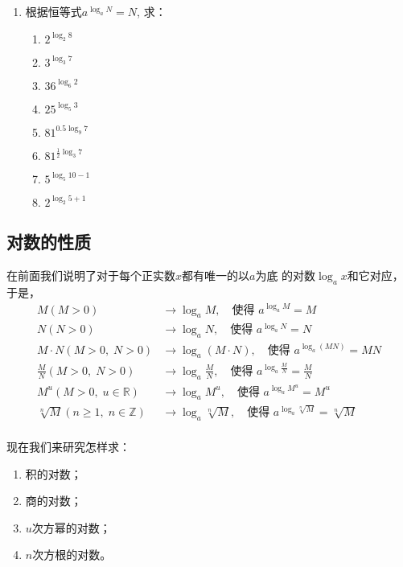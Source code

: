 \begin{ex}
\begin{enumerate}
\item 根据恒等式$a^{\log_a N}=N$, 求：
\begin{multicols}{3}
    \begin{enumerate}
        \item $2^{\log_2 8}$
        \item $3^{\log_3 7}$
        \item $36^{\log_6 2}$
        \item $25^{\log_5 3}$
        \item $81^{0.5\log_9 7}$
        \item $81^{\tfrac{1}{2}\log_3 7}$
        \item $5^{\log_5 10-1}$
        \item $2^{\log_2 5+1}$
    \end{enumerate}
    \end{multicols} 
\end{enumerate} 
\end{ex}

\subsection{对数的性质}
在前面我们说明了对于每个正实数$x$都有唯一的以$a$为底
的对数$\log_a x$和它对应，于是，
\[\begin{split}
   M(M>0)&\longrightarrow \log_a M,\quad \text{使得 } a^{\log_a M}=M \\
   N(N>0)&\longrightarrow \log_a N,\quad \text{使得 } a^{\log_a N}=N \\
   M\cdot N(M>0,\; N>0)&\longrightarrow \log_a (M\cdot N),\quad \text{使得 } a^{\log_a (MN)}=MN \\
   \frac{M}{N}(M>0,\; N>0)&\longrightarrow \log_a \frac{M}{N},\quad \text{使得 } a^{\log_a \tfrac{M}{N}}=\frac{M}{N} \\
   M^u(M>0,\; u\in\mathbb{R})&\longrightarrow \log_a M^u,\quad \text{使得 } a^{\log_a M^u}=M^u \\
   \sqrt[n]{M}(n\ge 1,\; n\in\mathbb{Z})&\longrightarrow \log_a \sqrt[n]{M},\quad \text{使得 } a^{\log_a \sqrt[n]{M}}=\sqrt[n]{M} \\
\end{split}\]

现在我们来研究怎样求：
\begin{enumerate}
    \item 积的对数；
    \item 商的对数；
    \item $u$次方幂的对数；
    \item $n$次方根的对数。
\end{enumerate}

